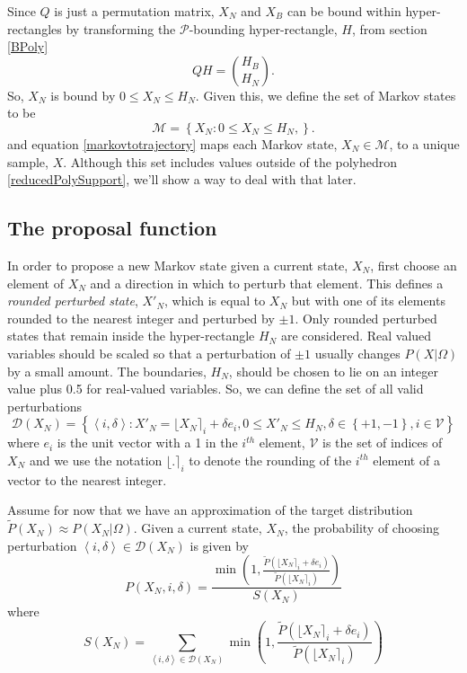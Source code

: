 \documentclass{article}
\begin{document}
Since $Q$ is just a permutation matrix, $X_N$ and $X_B$ can be bound within hyper-rectangles by transforming the $\mathcal{P}$-bounding hyper-rectangle, $H$, from section \ref{BPoly}
\[
QH = {H_B \choose H_N}.
\]
So, $X_N$ is bound by $0 \le X_N \le H_N$. Given this, we define the set of Markov states to be
\[
\mathcal{M} = \left\{ X_N: 0 \le X_N \le H_N, \right\}.
\]
and equation \eqref{markovtotrajectory} maps each Markov state, $X_N \in \mathcal{M}$, to a unique sample, $X$. Although this set includes values outside of the polyhedron \eqref{reducedPolySupport}, we'll show a way to deal with that later.

\subsection{The proposal function}
\label{theProposalFunction}
In order to propose a new Markov state given a current state, $X_N$, first choose an element of $X_N$ and a direction in which to perturb that element. This defines a \textit{rounded perturbed state}, $X'_N$,  which is equal to $X_N$ but with one of its elements rounded to the nearest integer and perturbed by $\pm 1$. Only rounded perturbed states that remain inside the hyper-rectangle $H_N$ are considered. Real valued variables should be scaled so that a perturbation of $\pm 1$ usually changes $P(X|\Omega)$ by a small amount. The boundaries, $H_N$, should be chosen to lie on an integer value plus 0.5 for real-valued variables. So, we can define the set of all valid perturbations
\[
\mathcal{D}(X_N) = \left\{\left<i,\delta\right> : X'_N = \lfloor X_N \rceil_i + \delta e_i, 0 \le X'_N \le H_N, \delta \in \left\{+1,-1\right\}, i \in \mathcal{V} \right\}
\]
where $e_i$ is the unit vector with a 1 in the $i^{th}$ element, $\mathcal{V}$ is the set of indices of $X_N$ and we use the notation $\lfloor . \rceil_i$ to denote the rounding of the $i^{th}$ element of a vector to the nearest integer.

Assume for now that we have an approximation of the target distribution $\tilde{P}(X_N) \approx P(X_N|\Omega)$. Given a current state, $X_N$, the probability of choosing perturbation $\left<i,\delta\right> \in \mathcal{D}(X_N)$ is given by
\begin{equation}
P(X_N,i,\delta) = \frac{\min\left(1, \frac{\tilde{P}(\lfloor X_N \rceil_i + \delta e_i)}{\tilde{P}(\lfloor X_N \rceil_i)}\right)}{S(X_N)} 
\label{transitionProb}
\end{equation}
where
\begin{equation}
S(X_N) = \sum_{\left<i,\delta\right> \in \mathcal{D}(X_N)} \min\left(1, \frac{\tilde{P}(\lfloor X_N \rceil_i + \delta e_i)}{\tilde{P}(\lfloor X_N \rceil_i)}\right)
\label{transitionSum}
\end{equation}
\end{document}
